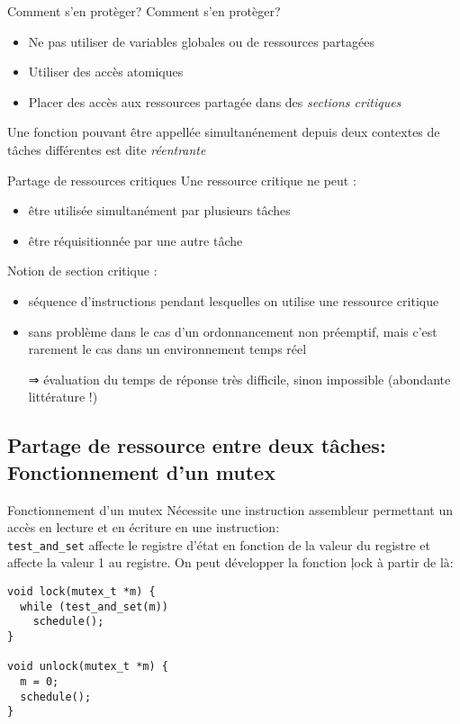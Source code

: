 \begin{frame}{Comment s'en protèger?}
  Comment s'en protèger?
  \begin{itemize} 
  \item  Ne  pas  utiliser  de  variables globales  ou  de  ressources
    partagées
  \item Utiliser des accès atomiques
  \item   Placer  des   accès   aux  ressources   partagée  dans   des
    \emph{sections critiques}
  \end{itemize} 
  Une  fonction  pouvant  être  appellée simultanénement  depuis  deux
  contextes de tâches différentes est dite \emph{réentrante}
\end{frame} 

\begin{frame}{Partage de ressources critiques} 
  Une ressource critique ne peut :
  \begin{itemize}
  \item être utilisée simultanément par plusieurs tâches
  \item être réquisitionnée par une autre tâche
  \end{itemize}
  Notion de section critique :
  \begin{itemize}
  \item  séquence  d'instructions pendant  lesquelles  on utilise  une
    ressource critique
  \item sans  problème dans le cas d'un  ordonnancement non préemptif,
    mais  c'est rarement  le cas  dans un  environnement temps  réel
  \item[⇒]  évaluation  du  temps  de réponse  très  difficile,  sinon
    impossible (abondante littérature !)
  \end{itemize}
\end{frame}

\subsection{Partage de ressource entre deux tâches: Fonctionnement d'un mutex}

\begin{frame}[fragile]{Fonctionnement d'un mutex}
  Nécessite une instruction assembleur  permettant un accès en lecture
  et en écriture  en une instruction: \\
  \texttt{test\_and\_set} affecte le registre d'état en fonction de la
  valeur  du registre  et affecte  la valeur  1 au  registre.  On peut
  développer la fonction \c{lock} à partir de là:
  \begin{lstlisting} 
void lock(mutex_t *m) {
  while (test_and_set(m))
    schedule();
}

void unlock(mutex_t *m) {
  m = 0;
  schedule();
}
  \end{lstlisting} 
\end{frame}

